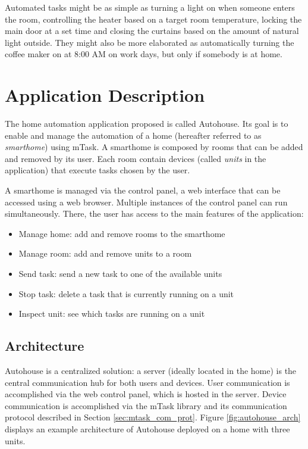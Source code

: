 Automated tasks might be as simple as turning a light on when someone enters the room, controlling the heater based on a target room temperature, locking the main door at a set time and closing the curtains based on the amount of natural light outside. They might also be more elaborated as automatically turning the coffee maker on at 8:00 AM on work days, but only if somebody is at home.

\section{Application Description}\label{sec:app_desc}

The home automation application proposed is called Autohouse. Its goal is to enable and manage the automation of a home (hereafter referred to as \textit{smarthome}) using \gls{mTask}. A smarthome is composed by rooms that can be added and removed by its user. Each room contain devices (called \textit{units} in the application) that execute tasks chosen by the user. 

A smarthome is managed via the control panel, a web interface that can be accessed using a web browser. Multiple instances of the control panel can run simultaneously. There, the user has access to the main features of the application:

\begin{itemize}
    \item Manage home: add and remove rooms to the smarthome
    \item Manage room: add and remove units to a room
    \item Send task: send a new task to one of the available units
    \item Stop task: delete a task that is currently running on a unit
    \item Inspect unit: see which tasks are running on a unit
\end{itemize}

\subsection{Architecture}

Autohouse is a centralized solution: a server (ideally located in the home) is the central communication hub for both users and devices. User communication is accomplished via the web control panel, which is hosted in the server. Device communication is accomplished via the \gls{mTask} library and its communication protocol described in Section \ref{sec:mtask_com_prot}. Figure \ref{fig:autohouse_arch} displays an example architecture of Autohouse deployed on a home with three units. 

